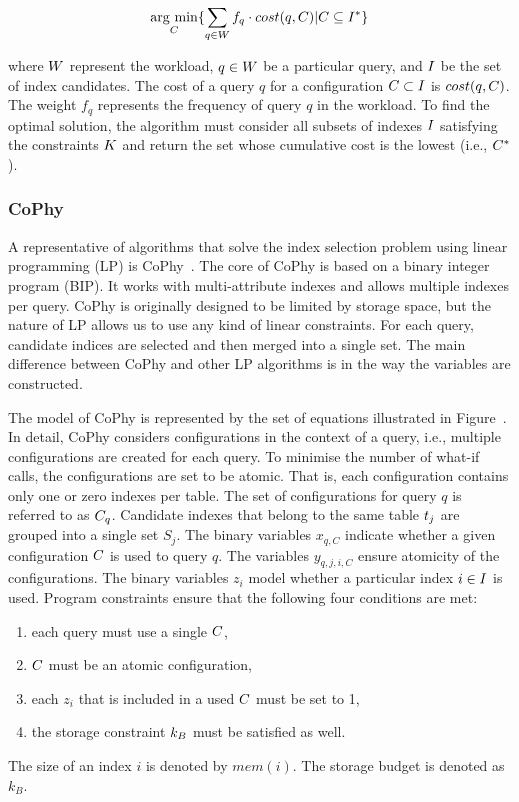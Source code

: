 $$ \underset{\FIndexConfigurationSet}{\mathrm{arg \ min}}\{ \sum_{q \in W} f_q \cdot cost(q,\FIndexConfigurationSet) | \FIndexConfigurationSet \subseteq \FIndexSet^* \}$$

\noindent where $W$ represent the workload, $q \in W$ be a particular query, and $I$ be the set of index candidates. The cost of a query $q$ for a configuration $C \subset I$ is $cost(q, C)$. The weight $f_q$ represents the frequency of query $q$ in the workload. To find the optimal solution, the algorithm must consider all subsets of indexes $I$ satisfying the constraints $K$ and return the set whose cumulative cost is the lowest (i.e., $C^*$).

\subsubsection{CoPhy}
A representative of algorithms that solve the index selection problem using linear programming (LP) is CoPhy~\citep{CoPhy11}. The core of CoPhy is based on a binary integer program (BIP). It works with multi-attribute indexes and allows multiple indexes per query. CoPhy is originally designed to be limited by storage space, but the nature of LP allows us to use any kind of linear constraints. For each query, candidate indices are selected and then merged into a single set. The main difference between CoPhy and other LP algorithms is in the way the variables are constructed.

The model of CoPhy is represented by the set of equations illustrated in Figure~. In detail, CoPhy considers configurations in the context of a query, i.e., multiple configurations are created for each query. To minimise the number of what-if calls, the configurations are set to be atomic. That is, each configuration contains only one or zero indexes per table. The set of configurations for query $q$ is referred to as $C_q$. Candidate indexes that belong to the same table $t_j$ are grouped into a single set $S_j$. The binary variables $x_{q,C}$ indicate whether a given configuration $C$ is used to query $q$. The variables $y_{q,j,i,C}$ ensure atomicity of the configurations. The binary variables $z_i$ model whether a particular index $i \in I$ is used. Program constraints ensure that the following four conditions are met:
\begin{enumerate}
    \item each query must use a single $C$,
    \item $C$ must be an atomic configuration,
    \item each $z_i$ that is included in a used $C$ must be set to 1,
    \item the storage constraint $k_B$ must be satisfied as well.
\end{enumerate}
The size of an index $i$ is denoted by $mem(i)$. The storage budget is denoted as $k_B$. 

